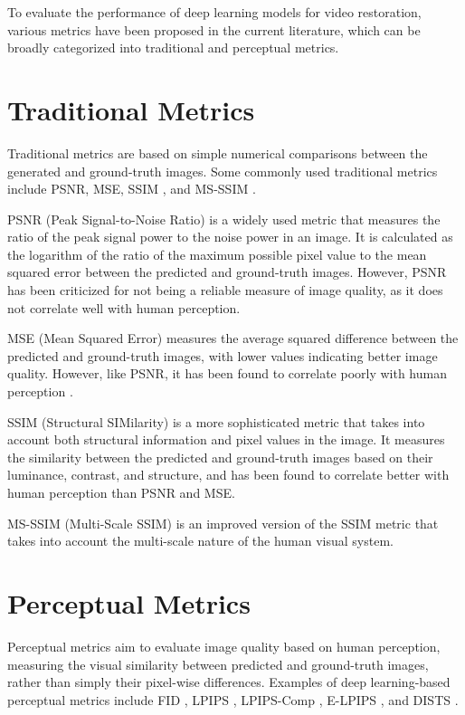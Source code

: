 \label{chap:Metrics}

To evaluate the performance of deep learning models for video restoration, various metrics have been proposed in the current literature, which can be broadly categorized into traditional and perceptual metrics.

\section{Traditional Metrics}
\label{sec:traditional-metrics}
Traditional metrics are based on simple numerical comparisons between the generated and ground-truth images. Some commonly used traditional metrics include PSNR, MSE, SSIM \cite{wang2004image}, and MS-SSIM \cite{wang2003multiscale}.

PSNR (Peak Signal-to-Noise Ratio) is a widely used metric that measures the ratio of the peak signal power to the noise power in an image. It is calculated as the logarithm of the ratio of the maximum possible pixel value to the mean squared error between the predicted and ground-truth images. However, PSNR has been criticized for not being a reliable measure of image quality, as it does not correlate well with human perception.

MSE (Mean Squared Error) measures the average squared difference between the predicted and ground-truth images, with lower values indicating better image quality. However, like PSNR, it has been found to correlate poorly with human perception \cite{girod1993s,wang2009mean}.

SSIM (Structural SIMilarity) is a more sophisticated metric that takes into account both structural information and pixel values in the image. It measures the similarity between the predicted and ground-truth images based on their luminance, contrast, and structure, and has been found to correlate better with human perception than PSNR and MSE.

MS-SSIM (Multi-Scale SSIM) is an improved version of the SSIM metric that takes into account the multi-scale nature of the human visual system.

\section{Perceptual Metrics}
\label{sec:perceptual-metrics}
Perceptual metrics aim to evaluate image quality based on human perception, measuring the visual similarity between predicted and ground-truth images, rather than simply their pixel-wise differences. Examples of deep learning-based perceptual metrics include FID \cite{heusel2017gans}, LPIPS \cite{zhang2018unreasonable}, LPIPS-Comp \cite{patel2021saliency}, E-LPIPS \cite{kettunen2019lpips}, and DISTS \cite{ding2020image}.

